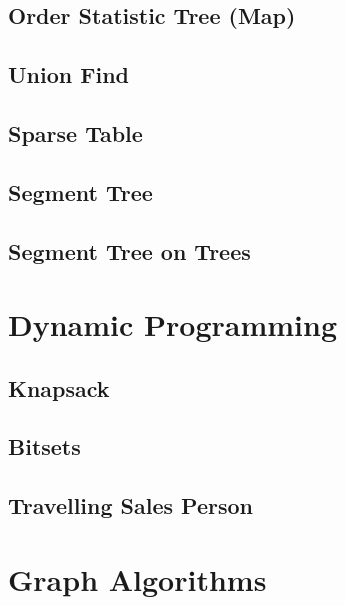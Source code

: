 \documentclass[11pt, letterpaper]{article}
\begin{document}
\subsection{Order Statistic Tree (Map)}


\subsection{Union Find}


\subsection{Sparse Table}


\subsection{Segment Tree}


\subsection{Segment Tree on Trees}


\section{Dynamic Programming}

\subsection{Knapsack}


\subsection{Bitsets}


\subsection{Travelling Sales Person}


\section{Graph Algorithms}
\end{document}
